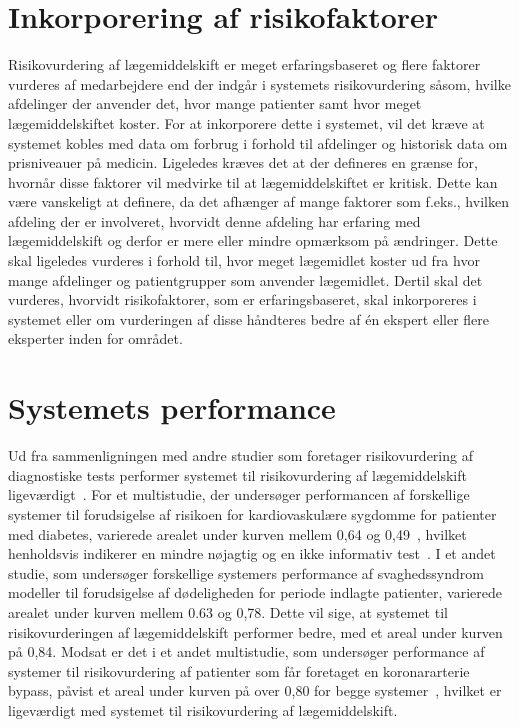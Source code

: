 \section{Inkorporering af risikofaktorer}
Risikovurdering af lægemiddelskift er meget erfaringsbaseret og flere faktorer vurderes af medarbejdere end der indgår i systemets risikovurdering såsom, hvilke afdelinger der anvender det, hvor mange patienter samt hvor meget lægemiddelskiftet koster. For at inkorporere dette i systemet, vil det kræve at systemet kobles med data om forbrug i forhold til afdelinger og historisk data om prisniveauer på medicin. Ligeledes kræves det at der defineres en grænse for, hvornår disse faktorer vil medvirke til at lægemiddelskiftet er kritisk. Dette kan være vanskeligt at definere, da det afhænger af mange faktorer som f.eks., hvilken afdeling der er involveret, hvorvidt denne afdeling har erfaring med lægemiddelskift og derfor er mere eller mindre opmærksom på ændringer. Dette skal ligeledes vurderes i forhold til, hvor meget lægemidlet koster ud fra hvor mange afdelinger og patientgrupper som anvender lægemidlet. Dertil skal det vurderes, hvorvidt risikofaktorer, som er erfaringsbaseret, skal inkorporeres i systemet eller om vurderingen af disse håndteres bedre af én ekspert eller flere eksperter inden for området.

\section{Systemets performance}
Ud fra sammenligningen med andre studier som foretager risikovurdering af diagnostiske tests performer systemet til risikovurdering af lægemiddelskift ligeværdigt~\citep{Chan2009,VanStraten2010}. For et multistudie, der undersøger performancen af forskellige systemer til forudsigelse af risikoen for kardiovaskulære sygdomme for patienter med diabetes, varierede arealet under kurven mellem 0,64 og 0,49~\citep{Chan2009}, hvilket henholdsvis indikerer en mindre nøjagtig og en ikke informativ test~\citep{Greiner2000}. I et andet studie, som undersøger forskellige systemers  performance af svaghedssyndrom modeller til forudsigelse af dødeligheden for periode indlagte patienter, varierede arealet under kurven mellem 0.63 og 0,78. Dette vil sige, at systemet til risikovurderingen af lægemiddelskift performer bedre, med et areal under kurven på 0,84.  Modsat er det i et andet multistudie, som undersøger performance af systemer til risikovurdering af patienter som får foretaget en koronararterie bypass, påvist et areal under kurven på over 0,80 for begge systemer~\citep{VanStraten2010}, hvilket er ligeværdigt med systemet til risikovurdering af lægemiddelskift.

